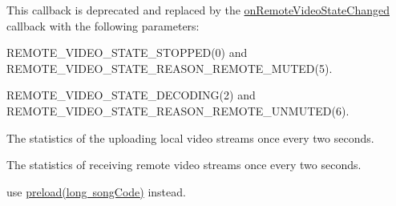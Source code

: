 \begin{DoxyRefList}
\item[Member \mbox{\hyperlink{classio_1_1agora_1_1rtc2_1_1_i_rtc_engine_event_handler_a9e43e9e2b70a0d4b20a0e0313a734c90}{io.agora.rtc2.I\+Rtc\+Engine\+Event\+Handler.on\+User\+Enable\+Local\+Video}} (int uid, boolean enabled)]\label{deprecated__deprecated000008}%
%
 This callback is deprecated and replaced by the \mbox{\hyperlink{classio_1_1agora_1_1rtc2_1_1_i_rtc_engine_event_handler_a5daae97f78becbf71dc3dbfd494f8419}{on\+Remote\+Video\+State\+Changed}} callback with the following parameters\+:
\begin{DoxyItemize}
\item {\ttfamily R\+E\+M\+O\+T\+E\+\_\+\+V\+I\+D\+E\+O\+\_\+\+S\+T\+A\+T\+E\+\_\+\+S\+T\+O\+P\+P\+E\+D(0)} and {\ttfamily R\+E\+M\+O\+T\+E\+\_\+\+V\+I\+D\+E\+O\+\_\+\+S\+T\+A\+T\+E\+\_\+\+R\+E\+A\+S\+O\+N\+\_\+\+R\+E\+M\+O\+T\+E\+\_\+\+M\+U\+T\+E\+D(5)}.
\item {\ttfamily R\+E\+M\+O\+T\+E\+\_\+\+V\+I\+D\+E\+O\+\_\+\+S\+T\+A\+T\+E\+\_\+\+D\+E\+C\+O\+D\+I\+N\+G(2)} and {\ttfamily R\+E\+M\+O\+T\+E\+\_\+\+V\+I\+D\+E\+O\+\_\+\+S\+T\+A\+T\+E\+\_\+\+R\+E\+A\+S\+O\+N\+\_\+\+R\+E\+M\+O\+T\+E\+\_\+\+U\+N\+M\+U\+T\+E\+D(6)}. 
\end{DoxyItemize}
\item[Member \mbox{\hyperlink{classio_1_1agora_1_1rtc2_1_1_i_rtc_engine_event_handler_a9af3b09098b1034319184103157b90db}{io.agora.rtc2.I\+Rtc\+Engine\+Event\+Handler.on\+Local\+Video\+Stat}} (int sent\+Bitrate, int sent\+Frame\+Rate)]\label{deprecated__deprecated000009}%
%
 The statistics of the uploading local video streams once every two seconds.  
\item[Member \mbox{\hyperlink{classio_1_1agora_1_1rtc2_1_1_i_rtc_engine_event_handler_a8a84e26cf72185b3c944b3a10983f600}{io.agora.rtc2.I\+Rtc\+Engine\+Event\+Handler.on\+Remote\+Video\+Stat}} (int uid, int delay, int received\+Bitrate, int received\+Frame\+Rate)]\label{deprecated__deprecated000010}%
%
 The statistics of receiving remote video streams once every two seconds. 
\item[Member \mbox{\hyperlink{classio_1_1agora_1_1musiccontentcenter_1_1_i_agora_music_content_center_a7681c81a454bd8f5b95f6fe223ed6814}{io.agora.musiccontentcenter.I\+Agora\+Music\+Content\+Center.preload}} (long song\+Code, String json\+Option)]\label{deprecated__deprecated000001}%
%
use \mbox{\hyperlink{classio_1_1agora_1_1musiccontentcenter_1_1_i_agora_music_content_center_a60fcd2708feec7e4cd7a3f0024ec73fb}{preload(long song\+Code)}} instead.  

\end{DoxyRefList}
